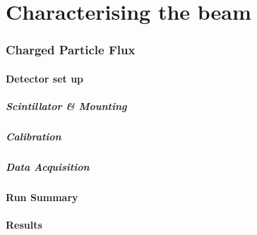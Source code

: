 \part{Characterising the beam} %
\label{prt:characterising_the_beam}
\section{Charged Particle Flux} %
\label{sec:charged_particle_flux}
\subsection{Detector set up} %
\label{sub:flux_flux_detector_set_up}
\subsubsection{Scintillator & Mounting} %
\label{ssub:flux_scintillator_mounting}

\subsubsection{Calibration} %
\label{ssub:flux_calibration}

\subsubsection{Data Acquisition} %
\label{ssub:flux_data_acquisition}

\subsection{Run Summary} %
\label{sub:flux_run_summary}

\subsection{Results} %
\label{sub:flux_results}

